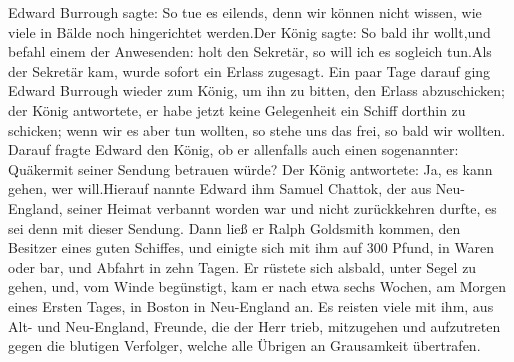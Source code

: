 Edward Burrough sagte: \glqq So tue es eilends, denn wir können nicht
wissen, wie viele in Bälde noch hingerichtet werden.\grqq Der König
sagte: \glqq So bald ihr wollt,\glqq und befahl einem der Anwesenden:
\grqq holt den Sekretär, so will ich es sogleich tun.\glqq Als der Sekretär
kam, wurde sofort ein Erlass zugesagt. Ein paar Tage darauf
ging Edward Burrough wieder zum König, um ihn zu bitten,
den Erlass abzuschicken; der König antwortete, er habe jetzt keine
Gelegenheit ein Schiff dorthin zu schicken; wenn wir es aber tun
wollten, so stehe uns das frei, so bald wir wollten. Darauf fragte
Edward den König, ob er allenfalls auch einen sogenannter:
\grqq Quäker\grqq mit seiner Sendung betrauen würde? Der König 
antwortete: \glqq Ja, es kann gehen, wer will.\grqq Hierauf nannte 
Edward ihm Samuel Chattok, der aus Neu-England, seiner Heimat
verbannt worden war und nicht zurückkehren durfte, es sei denn
mit dieser Sendung. Dann ließ er Ralph Goldsmith kommen,
den Besitzer eines guten Schiffes, und einigte sich mit ihm auf
300 Pfund, in Waren oder bar, und Abfahrt in zehn Tagen. Er
rüstete sich alsbald, unter Segel zu gehen, und, vom Winde 
begünstigt, kam er nach etwa sechs Wochen, am Morgen eines
Ersten Tages, in Boston in Neu-England an. Es reisten viele
mit ihm, aus Alt- und Neu-England, Freunde, die der Herr
trieb, mitzugehen und aufzutreten gegen die blutigen Verfolger,
welche alle Übrigen an Grausamkeit übertrafen.

